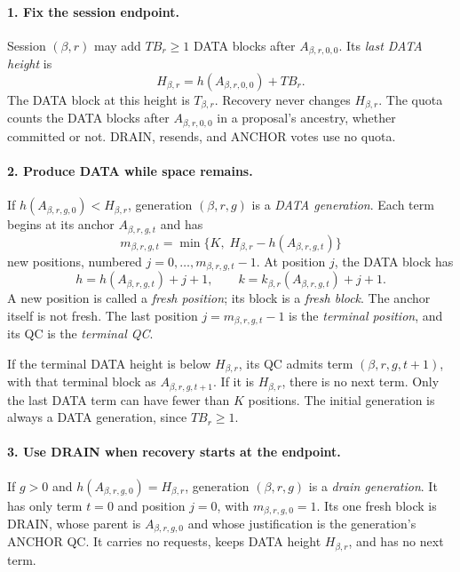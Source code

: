 \documentclass[11pt,a4paper]{article}
\newcommand{\TB}{\mathit{TB}}
\newcommand{\defterm}[1]{\textcolor{rrBlue}{\textit{#1}}}
\begin{document}
\paragraph{1. Fix the session endpoint.}
Session $(\beta,r)$ may add $\TB_r\ge1$ DATA blocks after $A_{\beta,r,0,0}$. Its \defterm{last
DATA height} is
\[
 H_{\beta,r}=h(A_{\beta,r,0,0})+\TB_r.
\]
The DATA block at this height is $T_{\beta,r}$. Recovery never changes $H_{\beta,r}$.
The quota counts the DATA blocks after $A_{\beta,r,0,0}$ in a proposal's
ancestry, whether committed or not. DRAIN, resends, and ANCHOR votes
use no quota.

\paragraph{2. Produce DATA while space remains.}
If $h(A_{\beta,r,g,0})<H_{\beta,r}$, generation $(\beta,r,g)$ is a \defterm{DATA generation}.
Each term begins at its anchor $A_{\beta,r,g,t}$ and has
\[
 m_{\beta,r,g,t}=\min\{K,\;H_{\beta,r}-h(A_{\beta,r,g,t})\}
\]
new positions, numbered $j=0,\ldots,m_{\beta,r,g,t}-1$. At position $j$, the
DATA block has
\[
 h=h(A_{\beta,r,g,t})+j+1,\qquad
 k=k_{\beta,r}(A_{\beta,r,g,t})+j+1.
\]
A new position is called a \defterm{fresh position}; its block is a
\defterm{fresh block}. The anchor itself is not fresh. The last position
$j=m_{\beta,r,g,t}-1$ is the \defterm{terminal position}, and its QC is the
\defterm{terminal QC}.

If the terminal DATA height is below $H_{\beta,r}$, its QC admits term
$(\beta,r,g,t+1)$, with that terminal block as $A_{\beta,r,g,t+1}$. If it is $H_{\beta,r}$,
there is no next term. Only the last DATA term can have fewer than $K$
positions. The initial generation is always a DATA generation, since
$\TB_r\ge1$.

\paragraph{3. Use DRAIN when recovery starts at the endpoint.}
If $g>0$ and $h(A_{\beta,r,g,0})=H_{\beta,r}$, generation $(\beta,r,g)$ is a
\defterm{drain generation}. It has only term $t=0$ and position $j=0$,
with $m_{\beta,r,g,0}=1$. Its one fresh block is DRAIN, whose parent is
$A_{\beta,r,g,0}$ and whose justification is the generation's ANCHOR QC.
It carries no requests, keeps DATA height $H_{\beta,r}$, and has no next term.
\end{document}
